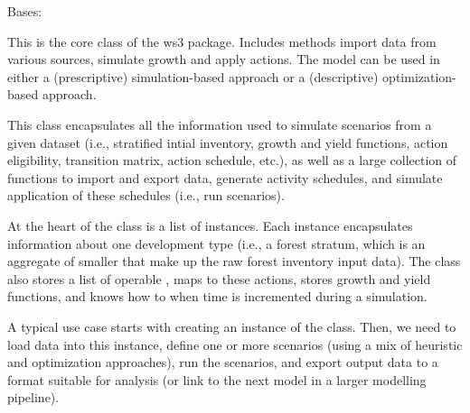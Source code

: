 \documentclass[letterpaper,10pt,english]{sphinxmanual}
\begin{document}
\begin{fulllineitems}
\label{\detokenize{forest:forest.ForestModel}}
Bases: 

This is the core class of the ws3 package.
Includes methods import data from various sources, simulate growth and apply actions.
The model can be used in either a (prescriptive) simulation-based approach or a (descriptive) optimization-based approach.

This class encapsulates all the information used to simulate scenarios from a given dataset (i.e., stratified intial inventory, growth and yield functions, action eligibility, transition matrix, action schedule, etc.), as well as a large collection of functions to import and export data, generate activity schedules, and simulate application of these schedules  (i.e., run scenarios).

At the heart of the  class is a list of  instances. Each  instance encapsulates information about one development type (i.e., a forest stratum, which is an aggregate of smaller  that make up the raw forest inventory input data). The  class also stores a list of operable , maps  to these actions, stores growth and yield functions, and knows how to  when time is incremented during a simulation.

A typical use case starts with creating an instance of the  class. Then, we need to load data into this instance, define one or more scenarios (using a mix of heuristic and optimization approaches), run the scenarios, and export output data to a format suitable for analysis (or link to the next model in a larger modelling pipeline).

\begin{fulllineitems}
\label{\detokenize{forest:forest.ForestModel.add_null_action}}
\end{fulllineitems}


\end{fulllineitems}
\end{document}
